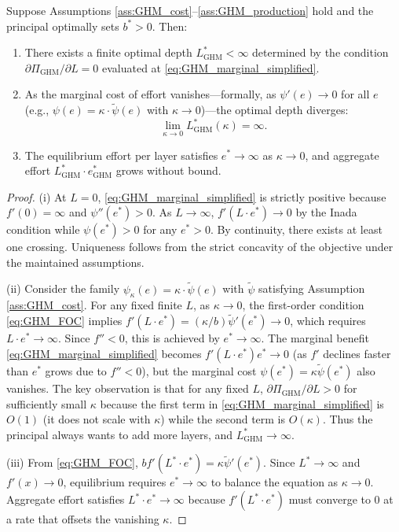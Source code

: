 \begin{proposition}
\label{prop:GHM_depth}
Suppose Assumptions \ref{ass:GHM_cost}--\ref{ass:GHM_production} hold and the principal optimally sets $b^* > 0$. Then:
\begin{enumerate}[label=(\roman*)]
    \item There exists a finite optimal depth $L^*_{\text{GHM}} < \infty$ determined by the condition $\partial \Pi_{\text{GHM}} / \partial L = 0$ evaluated at \eqref{eq:GHM_marginal_simplified}.
    
    \item As the marginal cost of effort vanishes---formally, as $\psi'(e) \to 0$ for all $e$ (e.g., $\psi(e) = \kappa \cdot \tilde{\psi}(e)$ with $\kappa \to 0$)---the optimal depth diverges:
    \begin{equation}
    \label{eq:GHM_infinite_depth}
    \lim_{\kappa \to 0} L^*_{\text{GHM}}(\kappa) = \infty.
    \end{equation}
    
    \item The equilibrium effort per layer satisfies $e^* \to \infty$ as $\kappa \to 0$, and aggregate effort $L^*_{\text{GHM}} \cdot e^*_{\text{GHM}}$ grows without bound.
\end{enumerate}
\end{proposition}

\begin{proof}
(i) At $L = 0$, \eqref{eq:GHM_marginal_simplified} is strictly positive because $f'(0) = \infty$ and $\psi''(e^*) > 0$. As $L \to \infty$, $f'(L \cdot e^*) \to 0$ by the Inada condition while $\psi(e^*) > 0$ for any $e^* > 0$. By continuity, there exists at least one crossing. Uniqueness follows from the strict concavity of the objective under the maintained assumptions.

(ii) Consider the family $\psi_\kappa(e) = \kappa \cdot \tilde{\psi}(e)$ with $\tilde{\psi}$ satisfying Assumption \ref{ass:GHM_cost}. For any fixed finite $L$, as $\kappa \to 0$, the first-order condition \eqref{eq:GHM_FOC} implies $f'(L \cdot e^*) = (\kappa/b) \tilde{\psi}'(e^*) \to 0$, which requires $L \cdot e^* \to \infty$. Since $f'' < 0$, this is achieved by $e^* \to \infty$. The marginal benefit \eqref{eq:GHM_marginal_simplified} becomes $f'(L \cdot e^*) e^* \to 0$ (as $f'$ declines faster than $e^*$ grows due to $f'' < 0$), but the marginal cost $\psi(e^*) = \kappa \tilde{\psi}(e^*)$ also vanishes. The key observation is that for any fixed $L$, $\partial \Pi_{\text{GHM}}/\partial L > 0$ for sufficiently small $\kappa$ because the first term in \eqref{eq:GHM_marginal_simplified} is $O(1)$ (it does not scale with $\kappa$) while the second term is $O(\kappa)$. Thus the principal always wants to add more layers, and $L^*_{\text{GHM}} \to \infty$.

(iii) From \eqref{eq:GHM_FOC}, $b f'(L^* \cdot e^*) = \kappa \tilde{\psi}'(e^*)$. Since $L^* \to \infty$ and $f'(x) \to 0$, equilibrium requires $e^* \to \infty$ to balance the equation as $\kappa \to 0$. Aggregate effort satisfies $L^* \cdot e^* \to \infty$ because $f'(L^* \cdot e^*)$ must converge to 0 at a rate that offsets the vanishing $\kappa$.
\end{proof}

